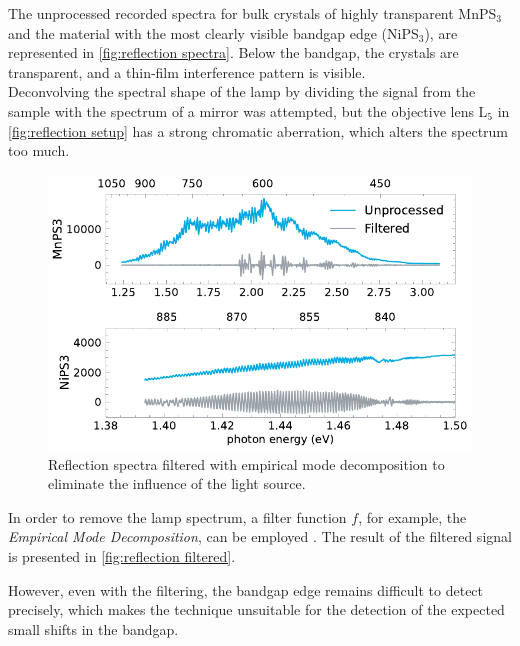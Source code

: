 \documentclass[
	twoside,
	parskip=half,
	a4paper,
]{scrbook}
\begin{document}
The unprocessed recorded spectra for bulk crystals of highly transparent MnPS$_3$ and the material with the most clearly visible bandgap edge (NiPS$_3$), are represented in \autoref{fig:reflection spectra}.
Below the bandgap, the crystals are transparent, and a thin-film interference pattern is visible.\\
Deconvolving the spectral shape of the lamp by dividing the signal from the sample with the spectrum of a mirror was attempted, but the objective lens L$_5$ in \autoref{fig:reflection setup} has a strong chromatic aberration, which alters the spectrum too much.
\begin{figure}
	\centering
	\includegraphics{../figures/2024-03-14 reflection spectra IMF.pdf}
	\caption{Reflection spectra filtered with empirical mode decomposition to eliminate the influence of the light source.}
	\label{fig:reflection filtered}
\end{figure}
In order to remove the lamp spectrum, a filter function $f$, for example, the \textit{Empirical Mode Decomposition}, can be employed \cite{thickness}.
The result of the filtered signal is presented in \autoref{fig:reflection filtered}.

However, even with the filtering, the bandgap edge remains difficult to detect precisely, which makes the technique unsuitable for the detection of the expected small shifts in the bandgap.
\end{document}
